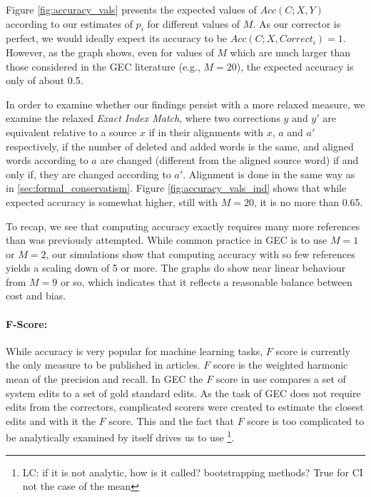 \documentclass[letter,11pt]{article}
\newcommand{\lc}[1]{\footnote{\color{green}LC: #1}}
\begin{document}
 Figure \ref{fig:accuracy_vals} presents the expected values of $Acc(C;X,Y)$ according to our estimates of $p_i$ for
 different values of $M$. As our corrector is perfect, we would ideally expect its accuracy to be
 $Acc(C;X,Correct_i) = 1$. However, as the graph shows, even for values of $M$ which are much larger than
 those considered in the GEC literature (e.g., $M=20$), the expected accuracy is only of about 0.5.
 
 In order to examine whether our findings persist with a more relaxed measure, we examine the relaxed
 {\it Exact Index Match}, where two corrections $y$ and $y'$
 are equivalent relative to a source $x$ if in their alignments with $x$, $a$ and $a'$ respectively,
 if the number of deleted and added words is the same, and aligned words according to $a$ are
 changed (different from the aligned source word) if and only if, they are changed according to $a'$. Alignment is done in the same way as in \ref{sec:formal_conservatism}. Figure \ref{fig:accuracy_vals_ind}
 shows that while expected accuracy is somewhat higher, still with $M=20$, it is no more than 0.65.
 
 To recap, we see that computing accuracy exactly requires many more references than was previously attempted.
 While common practice in GEC is to use $M=1$ or $M=2$, our simulations show that computing accuracy with
 so few references yields a scaling down of 5 or more. The graphs do show near linear behaviour from $M=9$ or
 so, which indicates that it reflects a reasonable balance between cost and bias.
 
 \paragraph{F-Score:}

 While accuracy is very popular for machine learning tasks, $F$ score is currently the
 only measure to be published in articles. $F$ score is the weighted harmonic mean of the precision and recall. In GEC the $F$ score in use compares a set of system edits to a set of gold standard edits. As the task of GEC does not require edits from the correctors, complicated scorers \cite{dahlmeier2012better} were created to estimate the closest edits and with it the $F$ score. This and the fact that $F$ score is too complicated to be analytically examined by itself  \cite{yeh2000more} drives us to use \lc{if it is not analytic, how is it called? bootstrapping methods? True for CI not the case of the mean}.
 
\end{document}
